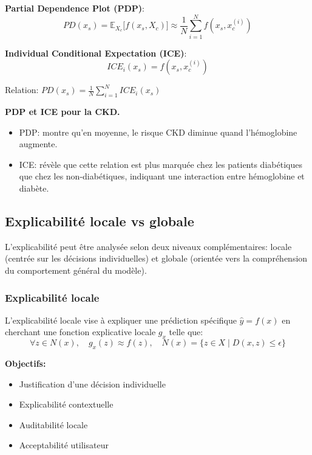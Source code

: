 \textbf{Partial Dependence Plot (PDP)}:
\[
PD(x_s) = \mathbb{E}_{X_c} \big[ f(x_s, X_c) \big] \approx \frac{1}{N} \sum_{i=1}^{N} f(x_s, x_c^{(i)})
\]

\textbf{Individual Conditional Expectation (ICE)}:
\[
ICE_i(x_s) = f(x_s, x_c^{(i)})
\]

Relation: $PD(x_s) = \frac{1}{N} \sum_{i=1}^{N} ICE_i(x_s)$

\textbf{PDP et ICE pour la CKD.}
\begin{itemize}
    \item PDP: montre qu'en moyenne, le risque CKD diminue quand l'hémoglobine augmente.
    \item ICE: révèle que cette relation est plus marquée chez les patients diabétiques que chez les non-diabétiques, indiquant une interaction entre hémoglobine et diabète.
\end{itemize}

\subsection{Explicabilité locale vs globale}

L’explicabilité peut être analysée selon deux niveaux complémentaires: locale (centrée sur les décisions individuelles) et globale (orientée vers la compréhension du comportement général du modèle).

\subsubsection{Explicabilité locale}

L’explicabilité locale vise à expliquer une prédiction spécifique $\hat{y} = f(x)$ en cherchant une fonction explicative locale $g_x$ telle que:
\[
\forall z \in N(x), \quad g_x(z) \approx f(z), \quad N(x) = \{ z \in X \mid D(x,z) \leq \epsilon \}
\]

\textbf{Objectifs:}
\begin{itemize}
    \item Justification d'une décision individuelle
    \item Explicabilité contextuelle
    \item Auditabilité locale
    \item Acceptabilité utilisateur
\end{itemize}

